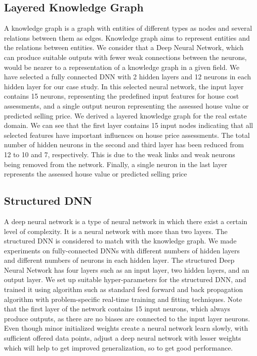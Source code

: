\documentclass[11pt,fleqn]{book} %
\begin{document}
\subsection{Layered Knowledge Graph}
 A knowledge graph is a graph with entities of different types as nodes and several relations between them as edges. Knowledge graph aims to represent entities and the relations between entities.  We consider that a Deep Neural Network, which can produce suitable outputs with fewer weak connections between the neurons, would be nearer to a representation of a knowledge graph in a given field. We have selected a fully connected DNN with 2 hidden layers and 12 neurons in each hidden layer for our case study. In this selected neural network, the input layer contains 15 neurons, representing the predefined input features for house cost assessments, and a single output neuron representing the assessed house value or predicted selling price. We derived a layered knowledge graph for the real estate domain. We can see that the first layer contains 15 input nodes indicating that all selected features have important influences on house price assessments. The total number of hidden neurons in the second and third layer has been reduced from 12 to 10 and 7, respectively. This is due to the weak links and weak neurons being removed from the network. Finally, a single neuron in the last layer represents the assessed house value or predicted selling price
 
 
 \subsection{\color{ocre} Structured DNN}
 A deep neural network is a type of neural network in which there exist a certain level of complexity. It is a neural network with more than two layers. The structured DNN is considered to match with the knowledge graph. We made experiments on fully-connected DNNs with different numbers of hidden layers and different numbers of neurons in each hidden layer. The structured Deep Neural Network has four layers such as an input layer, two hidden layers, and an output layer. We set up suitable hyper-parameters for the structured DNN, and trained it using algorithm such as standard feed forward and back propagation algorithm with problem-specific real-time training and fitting techniques. Note that the first layer of the network contains 15 input neurons, which always produce outputs, as there are no biases are connected to the input layer neurons. Even though minor initialized weights create a neural network learn slowly, with sufficient offered data points, adjust a deep neural network with lesser weights which will help to get improved generalization, so to get good performance.
\end{document}
